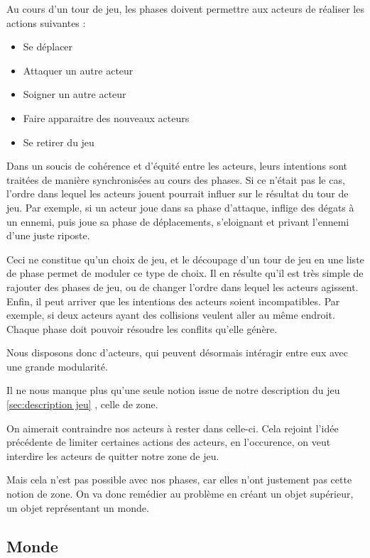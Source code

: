 \documentclass{article}
\begin{document}
Au cours d'un tour de jeu, les phases doivent permettre aux acteurs de réaliser les actions suivantes :
\vspace{-10px}
\begin{itemize}
  \item Se déplacer
  \item Attaquer un autre acteur
  \item Soigner un autre acteur
  \item Faire apparaitre des nouveaux acteurs
  \item Se retirer du jeu
\end{itemize}  
\vspace{8px}
Dans un soucis de cohérence et d'équité entre les acteurs, 
leurs intentions sont traitées de manière synchronisées au cours des phases.
Si ce n'était pas le cas, l'ordre dans lequel les acteurs jouent pourrait influer 
sur le résultat du tour de jeu. Par exemple, si un acteur joue dans sa 
phase d'attaque, inflige des dégats à un ennemi, puis joue sa phase de déplacements,
s'eloignant et privant l'ennemi d'une juste riposte.

Ceci ne constitue qu'un choix de jeu, et le découpage d'un tour de jeu en une liste de phase permet de moduler ce type de choix.
Il en résulte qu'il est très simple de rajouter des phases de jeu, ou de 
changer l'ordre dans lequel les acteurs agissent.
\vspace{8px}
Enfin, il peut arriver que les intentions des acteurs soient incompatibles.
Par exemple, si deux acteurs ayant des collisions veulent aller au même endroit.
Chaque phase doit pouvoir résoudre les conflits qu'elle génère.

Nous disposons donc d'acteurs, qui peuvent désormais intéragir entre eux avec 
une grande modularité.

Il ne nous manque plus qu'une seule notion issue de notre description du jeu 
\ref{sec:description jeu} , celle de zone.

On aimerait contraindre nos acteurs à rester dans celle-ci. Cela 
rejoint l'idée précédente de limiter certaines actions des acteurs, en l'occurence, 
on veut interdire les acteurs de quitter notre zone de jeu.

Mais cela n'est pas possible avec nos phases, car elles n'ont justement pas 
cette notion de zone.
On va donc remédier au problème en créant un objet supérieur, un objet représentant 
un monde.

\subsection{Monde}
\end{document}
